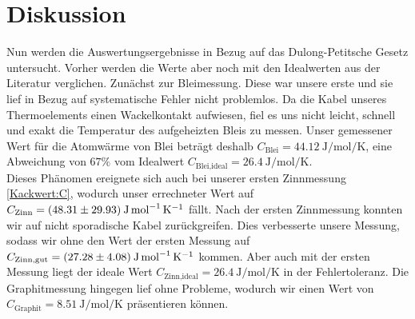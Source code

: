 \section{Diskussion}
\label{sec:Diskussion}
Nun werden die Auswertungsergebnisse in Bezug auf das Dulong-Petitsche Gesetz untersucht.
Vorher werden die Werte aber noch mit den Idealwerten aus der Literatur verglichen.
Zunächst zur Bleimessung.
Diese war unsere erste und sie lief in Bezug auf systematische Fehler nicht problemlos.
Da die Kabel unseres Thermoelements einen Wackelkontakt aufwiesen, fiel es uns nicht leicht, schnell und exakt die Temperatur des aufgeheizten Bleis zu messen.
Unser gemessener Wert für die Atomwärme von Blei beträgt deshalb $C_{\text{Blei}}=\SI{44,12}{\joule\per\mol\per\kelvin}$, eine Abweichung von $67\%$ vom Idealwert $C_{\text{Blei,ideal}}=\SI{26,4}{\joule\per\mol\per\kelvin}$.\\
Dieses Phänomen ereignete sich auch bei unserer ersten Zinnmessung \ref{Kackwert:C}, wodurch unser errechneter Wert auf $C_{\text{Zinn}}=(\num{48,31 +- 29,93})\: \si{\joule\per\mol\per\kelvin}$ fällt.
Nach der ersten Zinnmessung konnten wir auf nicht sporadische Kabel zurückgreifen.
Dies verbesserte unsere Messung, sodass wir ohne den Wert der ersten Messung auf $C_{\text{Zinn,gut}}=(\num{27,28 +- 4,08})\: \si{\joule\per\mol\per\kelvin}$ kommen.
Aber auch mit der ersten Messung liegt der ideale Wert $C_{\text{Zinn,ideal}}=\SI{26,4}{\joule\per\mol\per\kelvin}$
in der Fehlertoleranz.
Die Graphitmessung hingegen lief ohne Probleme, wodurch wir einen Wert von $C_{\text{Graphit}}=\SI{8,51}{\joule\per\mol\per\kelvin}$ präsentieren können.
